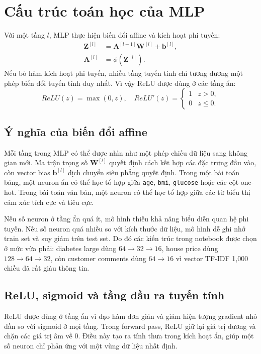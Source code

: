 \documentclass[12pt,a4paper]{report}
\begin{document}
\section{Cấu trúc toán học của MLP}
Với một tầng $l$, MLP thực hiện biến đổi affine và kích hoạt phi tuyến:
\begin{align}
    \mathbf{Z}^{[l]} &= \mathbf{A}^{[l-1]}\mathbf{W}^{[l]} + \mathbf{b}^{[l]}, \\
    \mathbf{A}^{[l]} &= \phi(\mathbf{Z}^{[l]}).
\end{align}
Nếu bỏ hàm kích hoạt phi tuyến, nhiều tầng tuyến tính chỉ tương đương một phép biến đổi tuyến tính duy nhất. Vì vậy ReLU được dùng ở các tầng ẩn:
\begin{equation}
    ReLU(z) = \max(0, z), \quad
    ReLU'(z) =
    \begin{cases}
        1 & z > 0,\\
        0 & z \le 0.
    \end{cases}
\end{equation}

\subsection{Ý nghĩa của biến đổi affine}
Mỗi tầng trong MLP có thể được nhìn như một phép chiếu dữ liệu sang không gian mới.
Ma trận trọng số $\mathbf{W}^{[l]}$ quyết định cách kết hợp các đặc trưng đầu vào, còn vector bias $\mathbf{b}^{[l]}$ dịch chuyển siêu phẳng quyết định.
Trong một bài toán bảng, một neuron ẩn có thể học tổ hợp giữa \texttt{age}, \texttt{bmi}, \texttt{glucose} hoặc các cột one-hot.
Trong bài toán văn bản, một neuron có thể học tổ hợp giữa các từ biểu thị cảm xúc tích cực và tiêu cực.

Nếu số neuron ở tầng ẩn quá ít, mô hình thiếu khả năng biểu diễn quan hệ phi tuyến.
Nếu số neuron quá nhiều so với kích thước dữ liệu, mô hình dễ ghi nhớ train set và suy giảm trên test set.
Do đó các kiến trúc trong notebook được chọn ở mức vừa phải: diabetes large dùng $64 \to 32 \to 16$, house price dùng $128 \to 64 \to 32$, còn customer comments dùng $64 \to 16$ vì vector TF-IDF 1,000 chiều đã rất giàu thông tin.

\subsection{ReLU, sigmoid và tầng đầu ra tuyến tính}
ReLU được dùng ở tầng ẩn vì đạo hàm đơn giản và giảm hiện tượng gradient nhỏ dần so với sigmoid ở mọi tầng.
Trong forward pass, ReLU giữ lại giá trị dương và chặn các giá trị âm về 0.
Điều này tạo ra tính thưa trong kích hoạt ẩn, giúp một số neuron chỉ phản ứng với một vùng dữ liệu nhất định.
\end{document}
